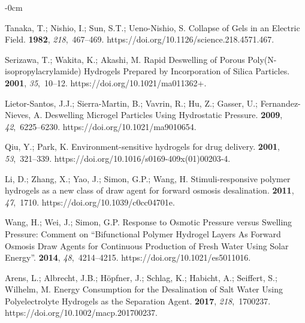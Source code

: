 \documentclass[gels,article,accept,pdftex,moreauthors]{Definitions/mdpi}
\begin{document}
\begin{adjustwidth}{-\extralength}{0cm}
\begin{thebibliography}{999}
Tanaka, T.; Nishio, I.; Sun, S.T.; Ueno-Nishio, S.
\newblock Collapse of Gels in an Electric Field.
 {\bf 1982}, {\em 218},~467--469.
\newblock
  https://doi.org/10.1126/science.218.4571.467.%

Serizawa, T.; Wakita, K.; Akashi, M.
\newblock Rapid Deswelling of Porous Poly(N-isopropylacrylamide) Hydrogels
  Prepared by Incorporation of Silica Particles.
 {\bf 2001}, {\em 35},~10--12.
\newblock
  https://doi.org/10.1021/ma011362+.%

Lietor-Santos, J.J.; Sierra-Martin, B.; Vavrin, R.; Hu, Z.; Gasser, U.;
  Fernandez-Nieves, A.
\newblock Deswelling Microgel Particles Using Hydrostatic Pressure.
 {\bf 2009}, {\em 42},~6225--6230.
\newblock
  https://doi.org/10.1021/ma9010654.%

Qiu, Y.; Park, K.
\newblock Environment-sensitive hydrogels for drug delivery.
 {\bf 2001}, {\em 53},~321--339.
\newblock
  https://doi.org/10.1016/s0169-409x(01)00203-4.%

Li, D.; Zhang, X.; Yao, J.; Simon, G.P.; Wang, H.
\newblock Stimuli-responsive polymer hydrogels as a new class of draw agent for
  forward osmosis desalination.
 {\bf 2011}, {\em 47},~1710.
\newblock
  https://doi.org/10.1039/c0cc04701e.%

Wang, H.; Wei, J.; Simon, G.P.
\newblock Response to Osmotic Pressure versus Swelling Pressure: Comment on
  {\textquotedblleft}Bifunctional Polymer Hydrogel Layers As Forward Osmosis
  Draw Agents for Continuous Production of Fresh Water Using Solar
  Energy{\textquotedblright}.
 {\bf 2014}, {\em
  48},~4214--4215.
\newblock
  https://doi.org/10.1021/es5011016.%

Arens, L.; Albrecht, J.B.; Höpfner, J.; Schlag, K.; Habicht, A.; Seiffert, S.;
  Wilhelm, M.
\newblock Energy Consumption for the Desalination of Salt Water Using
  Polyelectrolyte Hydrogels as the Separation Agent.
 {\bf 2017}, {\em 218},~1700237.
\newblock
  https://doi.org/10.1002/macp.201700237.%


\end{thebibliography}
\end{adjustwidth}
\end{document}
